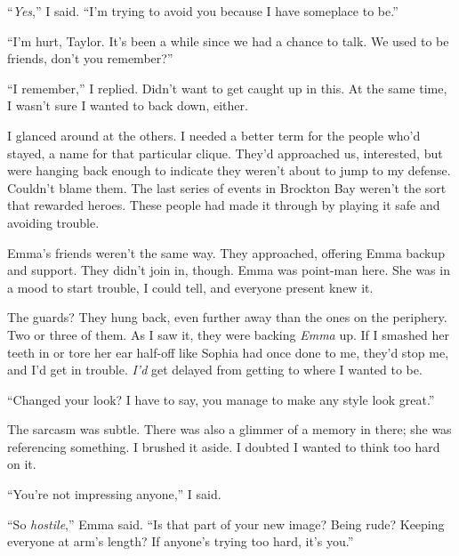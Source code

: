 





``\emph{Yes},'' I said.  ``I'm trying to avoid you because I have someplace to be.''



``I'm hurt, Taylor.  It's been a while since we had a chance to talk.  We used to be friends, don't you remember?''



``I remember,'' I replied.  Didn't want to get caught up in this.  At the same time, I wasn't sure I wanted to back down, either.



I glanced around at the others.  I needed a better term for the people who'd stayed, a name for that particular clique.  They'd approached us, interested, but were hanging back enough to indicate they weren't about to jump to my defense.  Couldn't blame them.  The last series of events in Brockton Bay weren't the sort that rewarded heroes.  These people had made it through by playing it safe and avoiding trouble.



Emma's friends weren't the same way.  They approached, offering Emma backup and support.  They didn't join in, though.  Emma was point-man here.  She was in a mood to start trouble, I could tell, and everyone present knew it.



The guards?  They hung back, even further away than the ones on the periphery.  Two or three of them.  As I saw it, they were backing \emph{Emma} up.  If I smashed her teeth in or tore her ear half-off like Sophia had once done to me, they'd stop me, and I'd get in trouble.  \emph{I'd} get delayed from getting to where I wanted to be.



``Changed your look?  I have to say, you manage to make any style look great.''



The sarcasm was subtle.  There was also a glimmer of a memory in there; she was referencing something.  I brushed it aside.  I doubted I wanted to think too hard on it.



``You're not impressing anyone,'' I said.



``So \emph{hostile},'' Emma said.  ``Is that part of your new image?  Being rude?  Keeping everyone at arm's length?  If anyone's trying too hard, it's you.''



